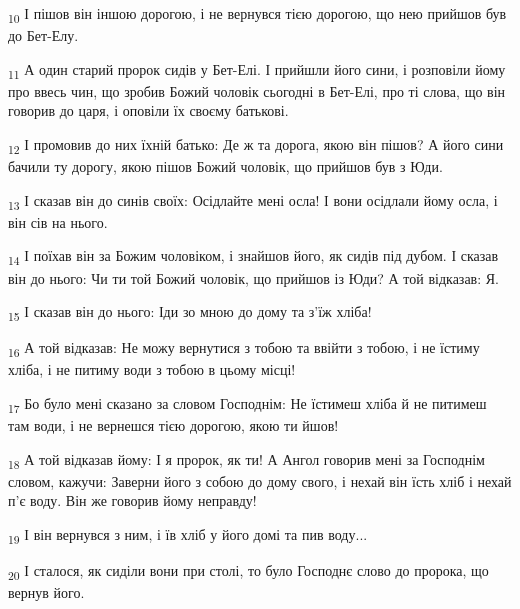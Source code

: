 \begin{tcolorbox}
\textsubscript{10} І пішов він іншою дорогою, і не вернувся тією дорогою, що нею прийшов був до Бет-Елу.
\end{tcolorbox}
\begin{tcolorbox}
\textsubscript{11} А один старий пророк сидів у Бет-Елі. І прийшли його сини, і розповіли йому про ввесь чин, що зробив Божий чоловік сьогодні в Бет-Елі, про ті слова, що він говорив до царя, і оповіли їх своєму батькові.
\end{tcolorbox}
\begin{tcolorbox}
\textsubscript{12} І промовив до них їхній батько: Де ж та дорога, якою він пішов? А його сини бачили ту дорогу, якою пішов Божий чоловік, що прийшов був з Юди.
\end{tcolorbox}
\begin{tcolorbox}
\textsubscript{13} І сказав він до синів своїх: Осідлайте мені осла! І вони осідлали йому осла, і він сів на нього.
\end{tcolorbox}
\begin{tcolorbox}
\textsubscript{14} І поїхав він за Божим чоловіком, і знайшов його, як сидів під дубом. І сказав він до нього: Чи ти той Божий чоловік, що прийшов із Юди? А той відказав: Я.
\end{tcolorbox}
\begin{tcolorbox}
\textsubscript{15} І сказав він до нього: Іди зо мною до дому та з'їж хліба!
\end{tcolorbox}
\begin{tcolorbox}
\textsubscript{16} А той відказав: Не можу вернутися з тобою та ввійти з тобою, і не їстиму хліба, і не питиму води з тобою в цьому місці!
\end{tcolorbox}
\begin{tcolorbox}
\textsubscript{17} Бо було мені сказано за словом Господнім: Не їстимеш хліба й не питимеш там води, і не вернешся тією дорогою, якою ти йшов!
\end{tcolorbox}
\begin{tcolorbox}
\textsubscript{18} А той відказав йому: І я пророк, як ти! А Ангол говорив мені за Господнім словом, кажучи: Заверни його з собою до дому свого, і нехай він їсть хліб і нехай п'є воду. Він же говорив йому неправду!
\end{tcolorbox}
\begin{tcolorbox}
\textsubscript{19} І він вернувся з ним, і їв хліб у його домі та пив воду...
\end{tcolorbox}
\begin{tcolorbox}
\textsubscript{20} І сталося, як сиділи вони при столі, то було Господнє слово до пророка, що вернув його.
\end{tcolorbox}
